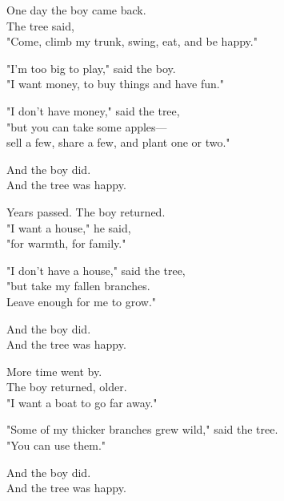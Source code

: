 \begin{center}
\begin{minipage}{0.85\textwidth}
\begin{multicols}{2}
\vspace{0.5em}

{\large One day the boy came back.\\
The tree said,\\
"Come, climb my trunk, swing, eat, and be happy."}

\vspace{0.5em}

{\large "I'm too big to play," said the boy.\\
"I want money, to buy things and have fun."}

{\large "I don't have money," said the tree,\\
"but you can take some apples—\\
sell a few, share a few, and plant one or two."}

\vspace{0.5em}

{\large And the boy did.\\
And the tree was happy.}

\vspace{0.5em}

\columnbreak

{\large Years passed. The boy returned.\\
"I want a house," he said,\\
"for warmth, for family."}

\vspace{0.5em}

{\large "I don't have a house," said the tree,\\
"but take my fallen branches.\\
Leave enough for me to grow."}

\vspace{0.5em}

{\large And the boy did.\\
And the tree was happy.}

\vspace{0.5em}

{\large More time went by.\\
The boy returned, older.\\
"I want a boat to go far away."}

\vspace{0.5em}

{\large "Some of my thicker branches grew wild," said the tree.\\
"You can use them."}

\vspace{0.5em}
{\large And the boy did.\\
And the tree was happy.}


\end{multicols}
\end{minipage}
\end{center}
